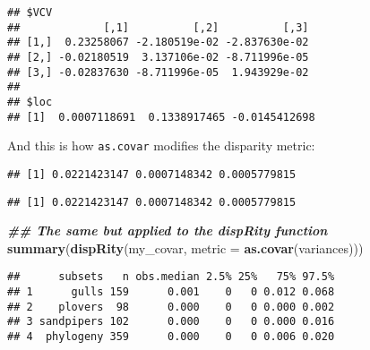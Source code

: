\documentclass[
]{book}
\newenvironment{Shaded}{\begin{snugshade}}{\end{snugshade}}
\newcommand{\AttributeTok}[1]{\textcolor[rgb]{0.13,0.29,0.53}{#1}}
\newcommand{\DecValTok}[1]{\textcolor[rgb]{0.00,0.00,0.81}{#1}}
\newcommand{\DocumentationTok}[1]{\textcolor[rgb]{0.56,0.35,0.01}{\textbf{\textit{#1}}}}
\newcommand{\FunctionTok}[1]{\textcolor[rgb]{0.13,0.29,0.53}{\textbf{#1}}}
\newcommand{\NormalTok}[1]{#1}
\newcommand{\SpecialCharTok}[1]{\textcolor[rgb]{0.81,0.36,0.00}{\textbf{#1}}}
\newcommand{\StringTok}[1]{\textcolor[rgb]{0.31,0.60,0.02}{#1}}
\begin{document}
\begin{verbatim}
## $VCV
##             [,1]          [,2]          [,3]
## [1,]  0.23258067 -2.180519e-02 -2.837630e-02
## [2,] -0.02180519  3.137106e-02 -8.711996e-05
## [3,] -0.02837630 -8.711996e-05  1.943929e-02
## 
## $loc
## [1]  0.0007118691  0.1338917465 -0.0145412698
\end{verbatim}

And this is how \texttt{as.covar} modifies the disparity metric:

\begin{Shaded}
\end{Shaded}

\begin{verbatim}
## [1] 0.0221423147 0.0007148342 0.0005779815
\end{verbatim}

\begin{Shaded}
\end{Shaded}

\begin{verbatim}
## [1] 0.0221423147 0.0007148342 0.0005779815
\end{verbatim}

\begin{Shaded}
\begin{Highlighting}[]
\DocumentationTok{\#\# The same but applied to the dispRity function}
\FunctionTok{summary}\NormalTok{(}\FunctionTok{dispRity}\NormalTok{(my\_covar, }\AttributeTok{metric =} \FunctionTok{as.covar}\NormalTok{(variances)))}
\end{Highlighting}
\end{Shaded}

\begin{verbatim}
##      subsets   n obs.median 2.5% 25%   75% 97.5%
## 1      gulls 159      0.001    0   0 0.012 0.068
## 2    plovers  98      0.000    0   0 0.000 0.002
## 3 sandpipers 102      0.000    0   0 0.000 0.016
## 4  phylogeny 359      0.000    0   0 0.006 0.020
\end{verbatim}
\end{document}
